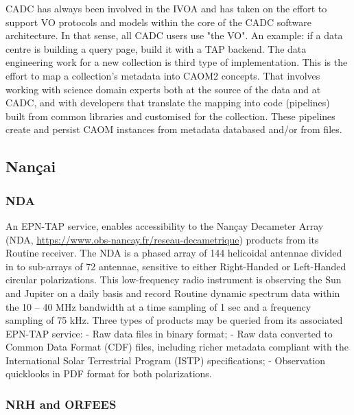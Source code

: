 \documentclass[11pt,a4paper]{ivoa}
\begin{document}
\begin{\itemize}
CADC has always been involved in the IVOA and has taken on the effort to support VO protocols and models within the core of the CADC software architecture. In that sense, all CADC users use "the VO".  An example: if a data centre is building a query page, build it with a TAP backend.
The data engineering work for a new collection is third type of implementation. This is the effort to map a collection's metadata into CAOM2 concepts. That involves working with science domain experts both at the source of the data and at CADC, and with developers that translate the mapping into code (pipelines) built from common libraries and customised for the collection. These pipelines create and persist CAOM instances from metadata databased and/or from files.

\subsection{Nan\c cai}
\label{sec:Nancay}

\subsubsection{NDA}

An EPN-TAP service, enables accessibility to the Nan\c cay Decameter Array (NDA, \url{https://www.obs-nancay.fr/reseau-decametrique}) products from its Routine receiver. The NDA is a phased array of 144 helicoidal antennae divided in to sub-arrays of 72 antennae, sensitive to either Right-Handed or Left-Handed circular polarizations. This low-frequency radio instrument is observing the Sun and Jupiter on a daily basis and record Routine dynamic spectrum data within the 10 – 40 MHz bandwidth at a time sampling of 1 sec and a frequency sampling of 75 kHz. Three types of products may be queried from its associated EPN-TAP service:
- Raw data files in binary format;
- Raw data converted to Common Data Format (CDF) files, including richer metadata compliant with the International Solar Terrestrial Program (ISTP) specifications;
- Observation quicklooks in PDF format for both polarizations.


\subsubsection{NRH and ORFEES}


\end{\itemize}
\end{document}
